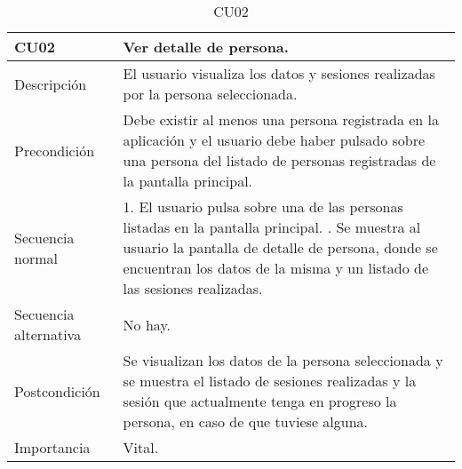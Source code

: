 \begin{table}[H]
\label{CU02}
\begin{center}
\begin{tabular}{| l | p{10cm} |}
\hline
CU02 & Ver detalle de persona.\\
\hline
Descripción & El usuario visualiza los datos y sesiones realizadas por la persona seleccionada.\\
\hline
Precondición & Debe existir al menos una persona registrada en la aplicación y el usuario debe haber pulsado sobre una persona del listado de personas registradas de la pantalla principal.\\
\hline
Secuencia normal & 1. El usuario pulsa sobre una de las personas listadas en la pantalla principal.
\newline 2. Se muestra al usuario la pantalla de detalle de persona, donde se encuentran los datos de la misma y un listado de las sesiones realizadas.\\
\hline
Secuencia alternativa & No hay.\\
\hline
Postcondición & Se visualizan los datos de la persona seleccionada y se muestra el listado de sesiones realizadas y la sesión que actualmente tenga en progreso la persona, en caso de que tuviese alguna.\\
\hline
Importancia & Vital.\\
\hline
\end{tabular}
\end{center}
\caption{CU02}
\end{table} 

